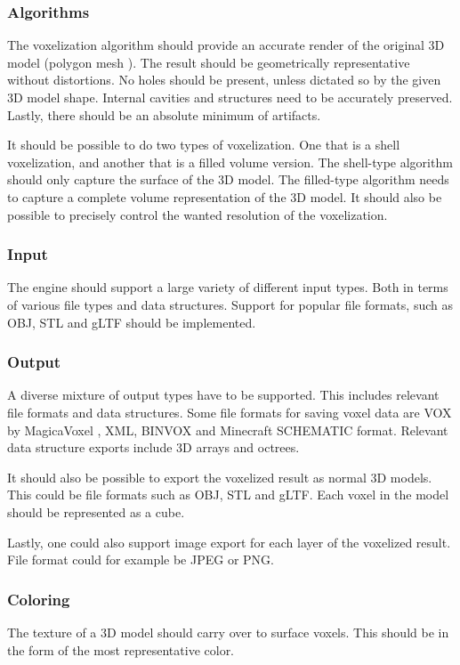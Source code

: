 \subsubsection{Algorithms}
The voxelization algorithm should provide an accurate render of the original 3D model (polygon mesh \cite{polygon-mesh}). The result should be geometrically representative without distortions. No holes should be present, unless dictated so by the given 3D model shape. Internal cavities and structures need to be accurately preserved. Lastly, there should be an absolute minimum of artifacts.

It should be possible to do two types of voxelization. One that is a shell voxelization, and another that is a filled volume version. The shell-type algorithm should only capture the surface of the 3D model. The filled-type algorithm needs to capture a complete volume representation of the 3D model. It should also be possible to precisely control the wanted resolution of the voxelization.

\subsubsection{Input}
The engine should support a large variety of different input types. Both in terms of various file types and data structures. Support for popular file formats, such as OBJ, STL and gLTF should be implemented.

\subsubsection{Output}
A diverse mixture of output types have to be supported. This includes relevant file formats and data structures. Some file formats for saving voxel data are VOX by MagicaVoxel \cite{magica-voxel}, XML, BINVOX \cite{binvox-file-format} and Minecraft SCHEMATIC format. Relevant data structure exports include 3D arrays and octrees.

It should also be possible to export the voxelized result as normal 3D models. This could be file formats such as OBJ, STL and gLTF. Each voxel in the model should be represented as a cube.

Lastly, one could also support image export for each layer of the voxelized result. File format could for example be JPEG or PNG.

\subsubsection{Coloring}
The texture of a 3D model should carry over to surface voxels. This should be in the form of the most representative color.

